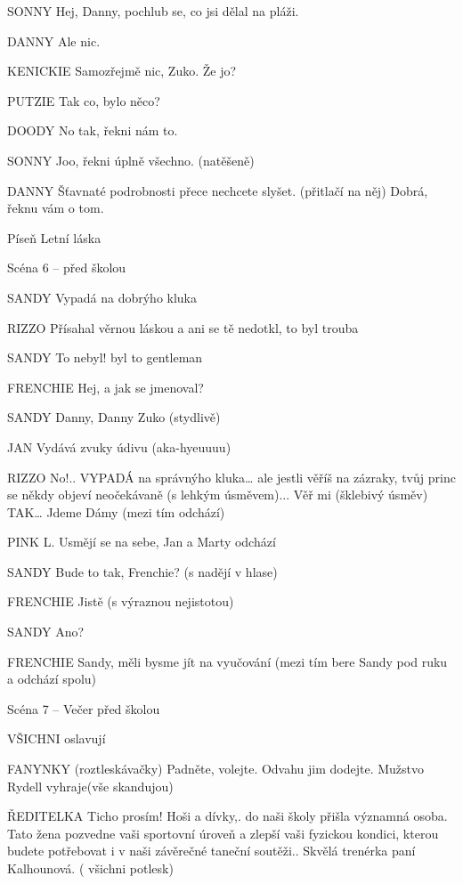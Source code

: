 SONNY        Hej, Danny,  pochlub se, co jsi dělal na pláži. 

DANNY        Ale nic. 

KENICKIE        Samozřejmě nic, Zuko. Že jo?

PUTZIE         Tak co, bylo něco?

DOODY        No tak, řekni nám to.

SONNY         Joo, řekni úplně všechno. (natěšeně)

DANNY        Šťavnaté podrobnosti přece nechcete slyšet. (přitlačí na něj) Dobrá,                 řeknu vám o tom.

Píseň Letní láska 

Scéna 6 – před školou 

SANDY                 Vypadá na dobrýho kluka

RIZZO        Přísahal věrnou láskou a ani se tě nedotkl, to byl trouba

SANDY        To nebyl! byl to gentleman

FRENCHIE        Hej, a jak se jmenoval?

SANDY        Danny, Danny Zuko (stydlivě)

JAN        Vydává zvuky údivu (aka-hyeuuuu)

RIZZO        No!.. VYPADÁ na správnýho kluka… ale jestli věříš na zázraky, tvůj princ         se někdy objeví neočekávaně (s lehkým úsměvem)... Věř mi (šklebivý         úsměv) TAK… Jdeme Dámy (mezi tím odchází)

PINK L.         Usmějí se na sebe, Jan a Marty odchází

SANDY        Bude to tak, Frenchie? (s nadějí v hlase)

FRENCHIE        Jistě (s výraznou nejistotou)

SANDY        Ano? 

FRENCHIE        Sandy, měli bysme jít na vyučování (mezi tím bere Sandy pod ruku a         odchází spolu)





Scéna 7 – Večer před školou

VŠICHNI                         oslavují 

      FANYNKY (roztleskávačky) Padněte, volejte. Odvahu jim dodejte. Mužstvo Rydell                                vyhraje(vše skandujou)

ŘEDITELKA         Ticho prosím! Hoši a dívky,. do naši školy přišla významná osoba.                  Tato žena pozvedne vaši sportovní úroveň a zlepší vaši fyzickou kondici,         kterou budete potřebovat i v naši závěrečné taneční soutěži.. Skvělá         trenérka paní Kalhounová. ( všichni potlesk)

